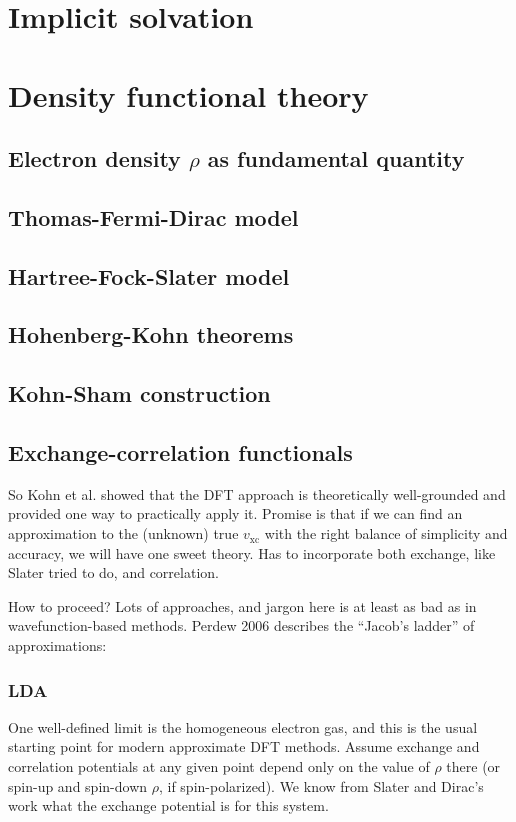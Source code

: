 \documentclass[11pt]{article}
\begin{document}
\newpage
\section{Implicit solvation}
\label{sec:org446a24a}
\section{Density functional theory}
\label{sec:orgbcc7a44}
\subsection{Electron density \(\rho\) as fundamental quantity}
\label{sec:orgb49fc5a}
\subsection{Thomas-Fermi-Dirac model}
\label{sec:org446ce4c}
\subsection{Hartree-Fock-Slater model}
\label{sec:orge9fe149}
\subsection{Hohenberg-Kohn theorems}
\label{sec:orgeb2c0bc}
\subsection{Kohn-Sham construction}
\label{sec:orge68a07c}
\subsection{Exchange-correlation functionals}
\label{sec:orgf197af7}
So Kohn et al. showed that the DFT approach is theoretically well-grounded and
provided one way to practically apply it. Promise is that if we can find an
approximation to the (unknown) true \(v_\text{xc}\) with the right balance of simplicity
and accuracy, we will have one sweet theory. Has to incorporate both exchange,
like Slater tried to do, and correlation.

How to proceed? Lots of approaches, and jargon here is at least as bad as in
wavefunction-based methods. Perdew 2006 describes the ``Jacob's ladder'' of
approximations:
\subsubsection{LDA}
\label{sec:org6044299}
One well-defined limit is the homogeneous electron gas, and this is the usual
starting point for modern approximate DFT methods. Assume exchange and
correlation potentials at any given point depend only on the value of \(\rho\) there
(or spin-up and spin-down \(\rho\), if spin-polarized). We know from Slater and
Dirac's work what the exchange potential is for this system.
\end{document}
